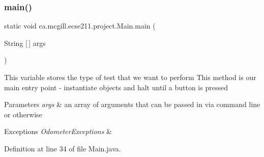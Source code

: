\subsubsection{\texorpdfstring{main()}{main()}}
{\footnotesize\ttfamily static void ca.\+mcgill.\+ecse211.\+project.\+Main.\+main (\begin{DoxyParamCaption}\item[{String \mbox{[}$\,$\mbox{]}}]{args }\end{DoxyParamCaption})\hspace{0.3cm}{\ttfamily [static]}}

This variable stores the type of test that we want to perform This method is our main entry point -\/ instantiate objects and halt until a button is pressed


\begin{DoxyParams}{Parameters}
{\em args} & an array of arguments that can be passed in via command line or otherwise \\
\hline
\end{DoxyParams}

\begin{DoxyExceptions}{Exceptions}
{\em Odometer\+Exceptions} & \\
\hline
\end{DoxyExceptions}


Definition at line 34 of file Main.\+java.


